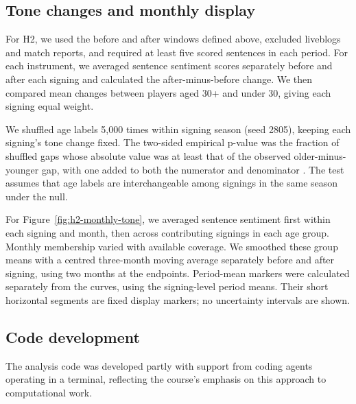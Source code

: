 \subsection*{Tone changes and monthly display}

For H2, we used the before and after windows defined above, excluded liveblogs and match reports, and required at least five scored sentences in each period. For each instrument, we averaged sentence sentiment scores separately before and after each signing and calculated the after-minus-before change. We then compared mean changes between players aged 30+ and under 30, giving each signing equal weight.

We shuffled age labels 5,000 times within signing season (seed 2805), keeping each signing's tone change fixed. The two-sided empirical p-value was the fraction of shuffled gaps whose absolute value was at least that of the observed older-minus-younger gap, with one added to both the numerator and denominator \cite{hemerik2018exact,phipson2010permutation}. The test assumes that age labels are interchangeable among signings in the same season under the null.

For Figure~\ref{fig:h2-monthly-tone}, we averaged sentence sentiment first within each signing and month, then across contributing signings in each age group. Monthly membership varied with available coverage. We smoothed these group means with a centred three-month moving average separately before and after signing, using two months at the endpoints. Period-mean markers were calculated separately from the curves, using the signing-level period means. Their short horizontal segments are fixed display markers; no uncertainty intervals are shown.

\subsection*{Code development}

The analysis code was developed partly with support from coding agents operating in a terminal, reflecting the course's emphasis on this approach to computational work.
